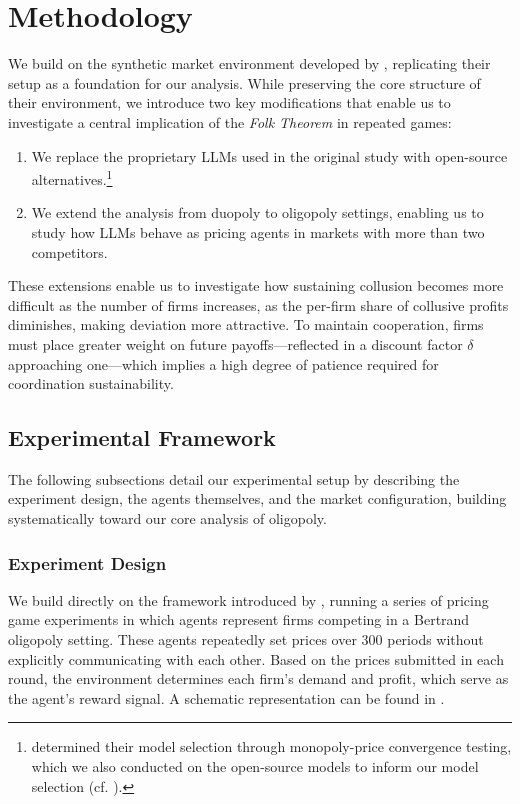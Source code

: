 \section{Methodology}\label{sec:meth}

We build on the synthetic market environment developed by \textcite{fish_algorithmic_2025}, replicating their setup as a foundation for our analysis. While preserving the core structure of their environment, we introduce two key modifications that enable us to investigate a central implication of the \emph{Folk Theorem} in repeated games:

\begin{enumerate}
    \item We replace the proprietary LLMs used in the original study with open-source alternatives.\footnote{\noindent\textcite{fish_algorithmic_2025} determined their model selection through monopoly-price convergence testing, which we also conducted on the open-source models to inform our model selection (cf. ).} 
    \item We extend the analysis from duopoly to oligopoly settings, enabling us to study how LLMs behave as pricing agents in markets with more than two competitors. 
\end{enumerate}

These extensions enable us to investigate how sustaining collusion becomes more difficult as the number of firms increases, as the per-firm share of collusive profits diminishes, making deviation more attractive. To maintain cooperation, firms must place greater weight on future payoffs—reflected in a discount factor $\delta$ approaching one—which implies a high degree of patience required for coordination sustainability.

\subsection{Experimental Framework}

The following subsections detail our experimental setup by describing the experiment design, the agents themselves, and the market configuration, building systematically toward our core analysis of oligopoly.

\subsubsection*{Experiment Design}

We build directly on the framework introduced by \textcite{fish_algorithmic_2025}, running a series of pricing game experiments in which agents represent firms competing in a Bertrand oligopoly setting. These agents repeatedly set prices over 300 periods without explicitly communicating with each other. Based on the prices submitted in each round, the environment determines each firm's demand and profit, which serve as the agent's reward signal. A schematic representation can be found in .

